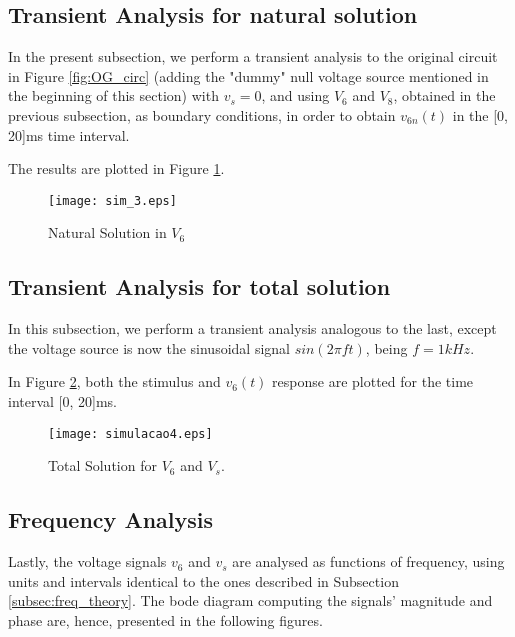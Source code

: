 \newpage



\subsection{Transient Analysis for natural solution}
\label{subsec:trans_nat}

In the present subsection, we perform a transient analysis to the original circuit in Figure \ref{fig:OG_circ} (adding the "dummy" null voltage source mentioned in the beginning of this section) with $v_s = 0$, and using $V_6$ and $V_8$, obtained in the previous subsection, as boundary conditions, in order to obtain $v_{6n}(t)$ in the [0, 20]ms time interval.

The results are plotted in Figure \ref{plot3S}.

\begin{figure}[h]
\centering
\texttt{[image: sim\_3.eps]}
\caption{Natural Solution in $V_6$}
\label{plot3S}
\end{figure}

\newpage


\subsection{Transient Analysis for total solution}
\label{subsec:trans_total}

In this subsection, we perform a transient analysis analogous to the last, except the voltage source is now the sinusoidal signal $sin(2 \pi f t)$, being $f = 1kHz$.

In Figure \ref{plot4S}, both the stimulus and $v_6(t)$ response are plotted for the time interval [0, 20]ms.

\begin{figure}[h]
\centering
\texttt{[image: simulacao4.eps]}
\caption{Total Solution for $V_6$ and $V_s$.}
\label{plot4S}
\end{figure}

\newpage

\subsection{Frequency Analysis}
\label{subsec:freq_sim}


Lastly, the voltage signals $v_6$ and $v_s$ are analysed as functions of frequency, using units and intervals identical to the ones described in Subsection \ref{subsec:freq_theory}. The bode diagram computing the signals' magnitude and phase are, hence, presented in the following figures.

